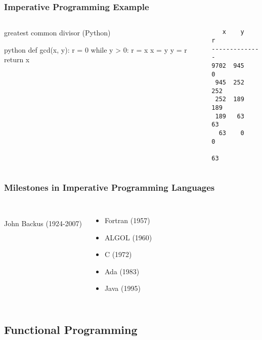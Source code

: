 \documentclass[dvipsnames]{beamer}
\theoremstyle{plain}
\begin{document}
\begin{frame}[fragile]
  \frametitle{Imperative Programming Example}

  \begin{columns}
    \begin{exampleblock}{greatest common divisor (Python)}
      \begin{pygments}{python}
def gcd(x, y):
    r = 0
    while y > 0:
        r = x %
        x = y
        y = r
    return x
      \end{pygments}
    \end{exampleblock}

    \begin{verbatim}
   x    y    r
--------------
9702  945    0
 945  252  252
 252  189  189
 189   63   63
  63    0    0

63
    \end{verbatim}
  \end{columns}
\end{frame}

\begin{frame}
  \frametitle{Milestones in Imperative Programming Languages}

  \begin{columns}
    \begin{center}
      \\
      John Backus (1924-2007)
    \end{center}

    \begin{itemize}
      \item Fortran (1957)
      \item ALGOL (1960)
      \item C (1972)
      \item Ada (1983)
      \item Java (1995)
    \end{itemize}
  \end{columns}
\end{frame}

\subsection{Functional Programming}
\end{document}
